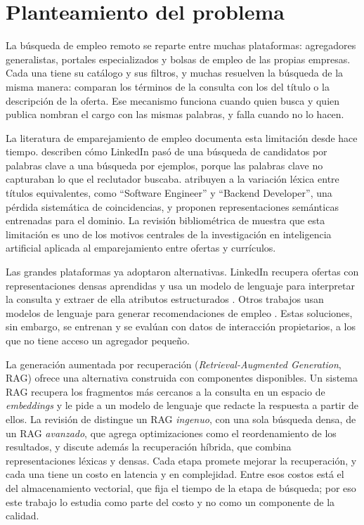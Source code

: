 
\section{Planteamiento del problema}
\label{sec:problema}

La búsqueda de empleo remoto se reparte entre muchas plataformas: agregadores generalistas, portales especializados y bolsas de empleo de las propias empresas. Cada una tiene su catálogo y sus filtros, y muchas resuelven la búsqueda de la misma manera: comparan los términos de la consulta con los del título o la descripción de la oferta. Ese mecanismo funciona cuando quien busca y quien publica nombran el cargo con las mismas palabras, y falla cuando no lo hacen.

La literatura de emparejamiento de empleo documenta esta limitación desde hace tiempo. \citet{HaThuc2017} describen cómo LinkedIn pasó de una búsqueda de candidatos por palabras clave a una búsqueda por ejemplos, porque las palabras clave no capturaban lo que el reclutador buscaba. \citet{Bocharova2023} atribuyen a la variación léxica entre títulos equivalentes, como \enquote{Software Engineer} y \enquote{Backend Developer}, una pérdida sistemática de coincidencias, y proponen representaciones semánticas entrenadas para el dominio. La revisión bibliométrica de \citet{RojasGaleano2022} muestra que esta limitación es uno de los motivos centrales de la investigación en inteligencia artificial aplicada al emparejamiento entre ofertas y currículos.

Las grandes plataformas ya adoptaron alternativas. LinkedIn recupera ofertas con representaciones densas aprendidas \citep{Shen2024} y usa un modelo de lenguaje para interpretar la consulta y extraer de ella atributos estructurados \citep{Liu2025}. Otros trabajos usan modelos de lenguaje para generar recomendaciones de empleo \citep{ZhengGIRL2023}. Estas soluciones, sin embargo, se entrenan y se evalúan con datos de interacción propietarios, a los que no tiene acceso un agregador pequeño.

La generación aumentada por recuperación (\textit{Retrieval-Augmented Generation}, RAG) \citep{Lewis2020} ofrece una alternativa construida con componentes disponibles. Un sistema RAG recupera los fragmentos más cercanos a la consulta en un espacio de \textit{embeddings} y le pide a un modelo de lenguaje que redacte la respuesta a partir de ellos. La revisión de \citet{Gao2023} distingue un RAG \emph{ingenuo}, con una sola búsqueda densa, de un RAG \emph{avanzado}, que agrega optimizaciones como el reordenamiento de los resultados, y discute además la recuperación híbrida, que combina representaciones léxicas y densas. Cada etapa promete mejorar la recuperación, y cada una tiene un costo en latencia y en complejidad. Entre esos costos está el del almacenamiento vectorial, que fija el tiempo de la etapa de búsqueda; por eso este trabajo lo estudia como parte del costo y no como un componente de la calidad.

